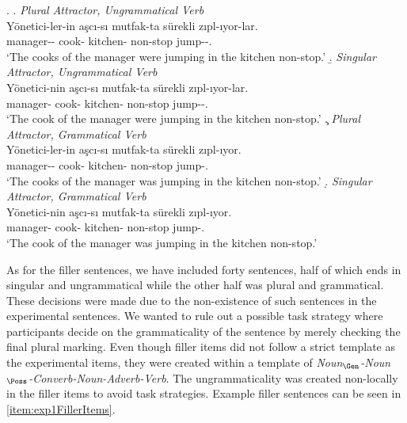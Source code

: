 \documentclass[a4paper,man,natbib]{apa6}\usepackage[]{graphicx}\usepackage[]{color}
\begin{document}
\ex. \label{item:exp1ExperimentalItems}
\a. \textit{Plural Attractor, Ungrammatical Verb} \label{item:exp1expitem-plpl}\\ 
\gll *Yönetici-ler-in aşcı-sı mutfak-ta sürekli zıpl-ıyor-lar.\\ 
manager-\Pl{}-\Gen{}  cook-\Poss{} kitchen-\Loc{} non-stop  jump-\Prog{}-\Pl{}.\\
\glt `The cooks of the manager were jumping in the kitchen non-stop.' 
\b. \textit{Singular Attractor, Ungrammatical Verb} \label{item:exp1expitem-sgpl}\\ 
\gll *Yönetici-nin aşcı-sı mutfak-ta sürekli zıpl-ıyor-lar.\\ 
manager-\Gen{}  cook-\Poss{} kitchen-\Loc{} non-stop  jump-\Prog{}-\Pl{}.\\
\glt `The cook of the manager were jumping in the kitchen non-stop.'
\c. \textit{Plural Attractor, Grammatical Verb} \label{item:exp1expitem-plsg}\\ 
\gll Yönetici-ler-in aşcı-sı mutfak-ta sürekli zıpl-ıyor.\\ 
manager-\Pl{}-\Gen{}  cook-\Poss{} kitchen-\Loc{} non-stop  jump-\Prog{}.\\
\glt `The cooks of the manager was jumping in the kitchen non-stop.'
\d. \textit{Singular Attractor, Grammatical Verb}\label{item:exp1expitem-sgsg}\\ 
\gll Yönetici-nin aşcı-sı mutfak-ta sürekli zıpl-ıyor. \\ 
manager-\Gen{}  cook-\Poss{} kitchen-\Loc{} non-stop  jump-\Prog{}.\\
\glt `The cook of the manager was jumping in the kitchen non-stop.'

As for the filler sentences, we have included forty sentences, half of which ends in singular and ungrammatical while the other half was plural and grammatical. These decisions were made due to the non-existence of such sentences in the experimental sentences. We wanted to rule out a possible task strategy where participants decide on the grammaticality of the sentence by merely checking the final plural marking. Even though filler items did not follow a strict template as the experimental items, they were created within a template of \textit{Noun$_{\Gen}$-Noun$_{\Poss}$-Converb-Noun-Adverb-Verb}. The ungrammaticality was created non-locally in the filler items to avoid task strategies. Example filler sentences can be seen in \ref{item:exp1FillerItems}.
\end{document}
